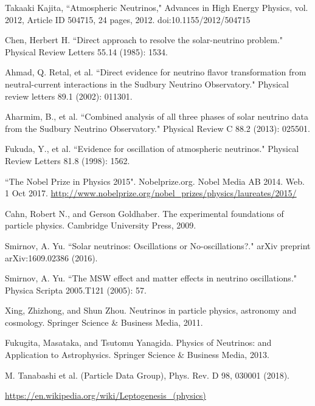 \documentclass[preprint,12pt]{elsarticle}
\numberwithin{equation}{section}
\begin{document}
\begin{thebibliography}{00}
 Takaaki Kajita, ``Atmospheric Neutrinos," Advances in High Energy Physics, vol. 2012, Article ID 504715, 24 pages, 2012. doi:10.1155/2012/504715

 Chen, Herbert H. ``Direct approach to resolve the solar-neutrino problem." Physical Review Letters 55.14 (1985): 1534.

 Ahmad, Q. Retal, et al. ``Direct evidence for neutrino flavor transformation from neutral-current interactions in the Sudbury Neutrino Observatory." Physical review letters 89.1 (2002): 011301.

 Aharmim, B., et al. ``Combined analysis of all three phases of solar neutrino data from the Sudbury Neutrino Observatory." Physical Review C 88.2 (2013): 025501.

 Fukuda, Y., et al. ``Evidence for oscillation of atmospheric neutrinos." Physical Review Letters 81.8 (1998): 1562.

 ``The Nobel Prize in Physics 2015". Nobelprize.org. Nobel Media AB 2014. Web. 1 Oct 2017. \url{http://www.nobelprize.org/nobel_prizes/physics/laureates/2015/}

 Cahn, Robert N., and Gerson Goldhaber. The experimental foundations of particle physics. Cambridge University Press, 2009.

 Smirnov, A. Yu. ``Solar neutrinos: Oscillations or No-oscillations?." arXiv preprint arXiv:1609.02386 (2016).

 Smirnov, A. Yu. ``The MSW effect and matter effects in neutrino oscillations." Physica Scripta 2005.T121 (2005): 57.

 Xing, Zhizhong, and Shun Zhou. Neutrinos in particle physics, astronomy and cosmology. Springer Science \& Business Media, 2011.

 Fukugita, Masataka, and Tsutomu Yanagida. Physics of Neutrinos: and Application to Astrophysics. Springer Science \& Business Media, 2013.

 M. Tanabashi et al. (Particle Data Group), Phys. Rev. D 98, 030001 (2018).

\url{https://en.wikipedia.org/wiki/Leptogenesis_(physics)}



\end{thebibliography}
\end{document}

